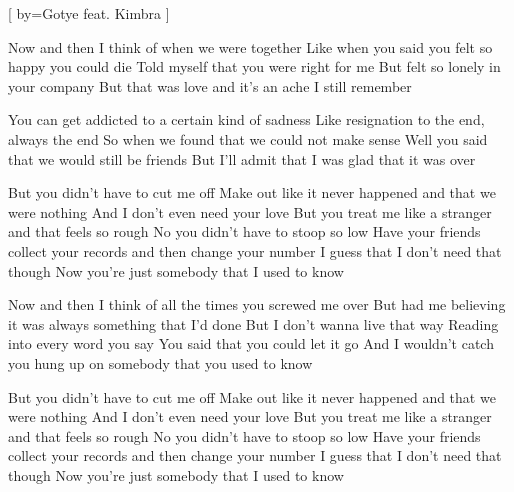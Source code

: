 [
by={Gotye feat. Kimbra} %
]



	\beginverse*\memorize %
		Now and then I think of when we were together
		Like when you said you felt so happy you could die
		Told myself that you were right for me
		But felt so lonely in your company
		But that was love and it's an ache I still remember
	\endverse

	\beginverse*
		You can get addicted to a certain kind of sadness
		Like resignation to the end, always the end
		So when we found that we could not make sense
		Well you said that we would still be friends
		But I'll admit that I was glad that it was over
	\endverse

	\beginchorus
		But you didn't have to cut me off
		Make out like it never happened and that we were nothing
		And I don't even need your love
		But you treat me like a stranger and that feels so rough
		No you didn't have to stoop so low
		Have your friends collect your records and then change your number
		I guess that I don't need that though
		Now you're just somebody that I used to know 
	\endchorus

	\beginverse*
		Now and then I think of all the times you screwed me over
		But had me believing it was always something that I'd done
		But I don't wanna live that way
		Reading into every word you say
		You said that you could let it go
		And I wouldn't catch you hung up on somebody that you used to know
	\endverse

	\beginchorus
		But you didn't have to cut me off
		Make out like it never happened and that we were nothing
		And I don't even need your love
		But you treat me like a stranger and that feels so rough
		No you didn't have to stoop so low
		Have your friends collect your records and then change your number
		I guess that I don't need that though
		Now you're just somebody that I used to know
	\endchorus

